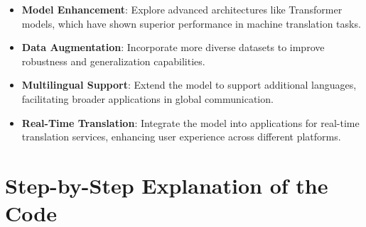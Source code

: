 \documentclass{article}
\begin{document}
\begin{itemize}
    \item \textbf{Model Enhancement}: Explore advanced architectures like Transformer models, which have shown superior performance in machine translation tasks.
    
    \item \textbf{Data Augmentation}: Incorporate more diverse datasets to improve robustness and generalization capabilities.
    
    \item \textbf{Multilingual Support}: Extend the model to support additional languages, facilitating broader applications in global communication.
    
    \item \textbf{Real-Time Translation}: Integrate the model into applications for real-time translation services, enhancing user experience across different platforms.
\end{itemize}



\section{Step-by-Step Explanation of the Code}
\end{document}
